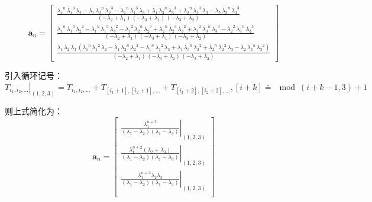 \documentclass[UTF8,zihao=5]{ctexart}
\newcommand{\bm}[1]{{\mathbf{#1}}}
\begin{document}
\begin{equation}
    \bm{a}_n=\left[\begin{array}{c} \frac{{\lambda _{1}}^n\,{\lambda _{1}}^3\,\lambda _{2}-\lambda _{1}\,{\lambda _{2}}^n\,{\lambda _{2}}^3-{\lambda _{1}}^n\,{\lambda _{1}}^3\,\lambda _{3}+\lambda _{1}\,{\lambda _{3}}^n\,{\lambda _{3}}^3+{\lambda _{2}}^n\,{\lambda _{2}}^3\,\lambda _{3}-\lambda _{2}\,{\lambda _{3}}^n\,{\lambda _{3}}^3}{\left(-\lambda _{2}+\lambda _{1}\right)\,\left(-\lambda _{3}+\lambda _{1}\right)\,\left(-\lambda _{3}+\lambda _{2}\right)}\\ \frac{{\lambda _{1}}^n\,{\lambda _{1}}^3\,{\lambda _{2}}^2-{\lambda _{1}}^n\,{\lambda _{1}}^3\,{\lambda _{3}}^2-{\lambda _{1}}^2\,{\lambda _{2}}^n\,{\lambda _{2}}^3+{\lambda _{2}}^n\,{\lambda _{2}}^3\,{\lambda _{3}}^2+{\lambda _{1}}^2\,{\lambda _{3}}^n\,{\lambda _{3}}^3-{\lambda _{2}}^2\,{\lambda _{3}}^n\,{\lambda _{3}}^3}{\left(-\lambda _{2}+\lambda _{1}\right)\,\left(-\lambda _{3}+\lambda _{1}\right)\,\left(-\lambda _{3}+\lambda _{2}\right)}\\ \frac{\lambda _{1}\,\lambda _{2}\,\lambda _{3}\,\left({\lambda _{1}}^n\,{\lambda _{1}}^2\,\lambda _{2}-\lambda _{1}\,{\lambda _{2}}^n\,{\lambda _{2}}^2-{\lambda _{1}}^n\,{\lambda _{1}}^2\,\lambda _{3}+\lambda _{1}\,{\lambda _{3}}^n\,{\lambda _{3}}^2+{\lambda _{2}}^n\,{\lambda _{2}}^2\,\lambda _{3}-\lambda _{2}\,{\lambda _{3}}^n\,{\lambda _{3}}^2\right)}{\left(-\lambda _{2}+\lambda _{1}\right)\,\left(-\lambda _{3}+\lambda _{1}\right)\,\left(-\lambda _{3}+\lambda _{2}\right)} \end{array}\right]
\end{equation}

引入循环记号：$\left.T_{i_1,i_2,...}\right|_{(1,2,3)}=T_{i_1,i_2,...}+T_{[i_1+1],[i_2+1],...}+T_{[i_1+2],[i_2+2],...}, [i+k]\doteq\mod{(i+k-1,3)}+1$

则上式简化为：
\begin{equation}
    \bm{a}_n=\begin{bmatrix}
        \left.\frac{\lambda_1^{n+2}}{(\lambda_1-\lambda_2)(\lambda_1-\lambda_3)}\right|_{(1,2,3)}\\
        \left.\frac{\lambda_1^{n+2}(\lambda_2+\lambda_3)}{(\lambda_1-\lambda_2)(\lambda_1-\lambda_3)}\right|_{(1,2,3)}\\
        \left.\frac{\lambda_1^{n+2}\lambda_2\lambda_3}{(\lambda_1-\lambda_2)(\lambda_1-\lambda_3)}\right|_{(1,2,3)}\\
    \end{bmatrix}
    \label{eq:EX_0}
\end{equation}
\end{document}
